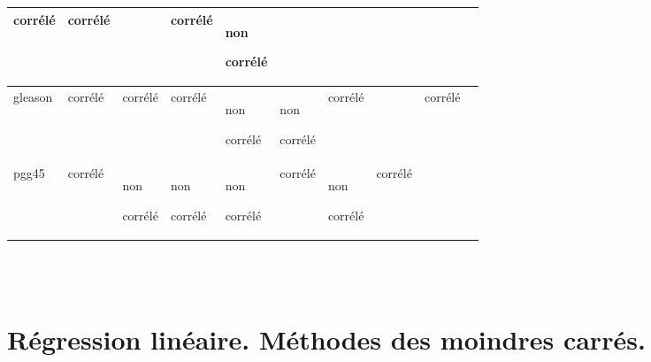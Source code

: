 \documentclass[a4paper, 12pt]{article}
\begin{document}
\begin{enumerate}
\begin{tabular}{|p{1.4cm}|p{1.4cm}|p{1.4cm}|p{1.4cm}|p{1.4cm}|p{1.4cm}|p{1.4cm}|p{1.4cm}|p{1.4cm}|p{1.4cm}|}
   corrélé & corrélé &  & corrélé & non

    corrélé \\
    \hline
    gleason & corrélé & corrélé & corrélé & non 

    corrélé & non 

    corrélé & corrélé & & corrélé \\
    \hline
    pgg45 & corrélé & non 

    corrélé & non 

    corrélé & non 

    corrélé & corrélé & non 

    corrélé & corrélé & \\
    \hline

\end{tabular}
\\\\
\end{enumerate}



\section{Régression linéaire. Méthodes des moindres carrés.}
\end{document}
